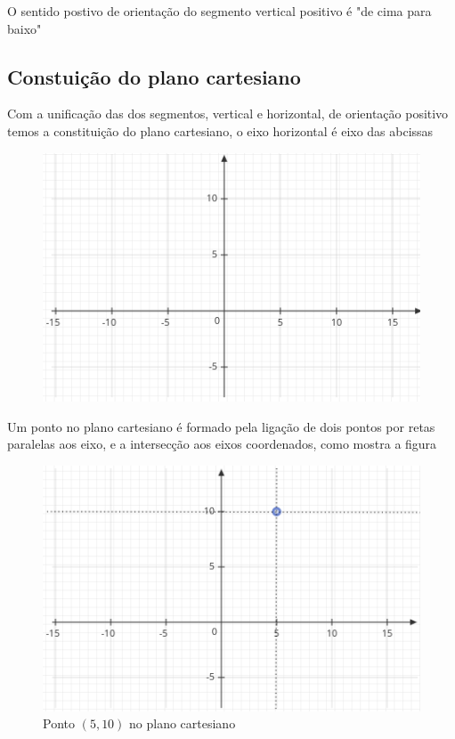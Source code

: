\begin{multicols*}{2}
\begin{itemize}
\begin{itemize}
              \end{itemize}

    \end{itemize}
    O sentido postivo de orientação do segmento vertical positivo é "de cima para baixo"
    \subsection{Constuição do plano cartesiano}
    Com a unificação das dos segmentos, vertical e horizontal, de orientação positivo temos a constituição do plano cartesiano, o eixo horizontal é eixo das abcissas

    \begin{figure}[H]
        \centering
        \includegraphics[scale=0.5]{assets/rafael/img25.png}
    \end{figure}
    Um ponto no plano cartesiano é formado pela ligação de dois pontos por retas paralelas aos eixo, e a intersecção aos eixos coordenados, como mostra a figura
    \begin{figure}[H]
        \centering
        \caption{Ponto $(5,10)$ no plano cartesiano}
        \includegraphics[scale=0.5]{assets/rafael/img26.png}
    \end{figure}


\end{multicols*}
